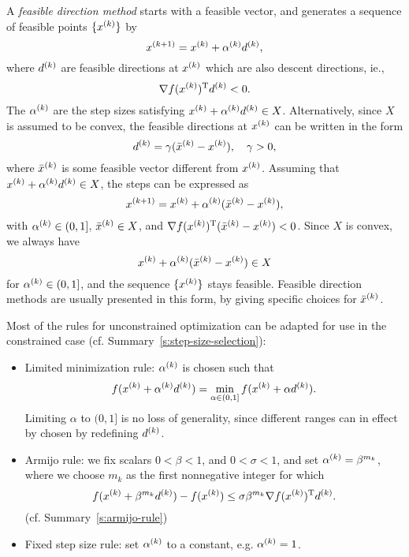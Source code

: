 \documentclass{article}
\begin{document}
A \emph{feasible direction method} starts with a feasible vector, and generates a sequence of
feasible points \(\{\kth{x}\}\) by
\begin{equation*}
  \kth[k+1]{x} = \kth{x} + \kth{\alpha}\kth{d},
\end{equation*}
where \(\kth{d}\) are feasible directions at \(\kth{x}\) which are also descent directions, ie.,
\begin{equation*}
  \T{\nabla f(\kth{x})}\kth{d} < 0.
\end{equation*}
The \(\kth{\alpha}\) are the step sizes satisfying \(\kth{x} + \kth{\alpha} \kth{d} \in X\).
Alternatively, since \(X\) is assumed to be convex, the feasible directions at \(\kth{x}\) can be
written in the form
\begin{equation*}
  \kth{d} = \gamma(\kth{\bar{x}} - \kth{x}), \quad \gamma > 0,
\end{equation*}
where \(\kth{\bar{x}}\) is some feasible vector different from \(\kth{x}\).  Assuming that
\(\kth{x} + \kth{\alpha} \kth{d} \in X\), the steps can be expressed as
\begin{equation*}
  \kth[k+1]{x} = \kth{x} + \kth{\alpha}(\kth{\bar{x}} - \kth{x}),
\end{equation*}
with \(\kth{\alpha} \in (0, 1]\), \(\kth{\bar{x}} \in X\), and
\(\T{\nabla f(\kth{x})}(\kth{\bar{x}} - \kth{x}) < 0\).  Since \(X\) is convex, we always have
\begin{equation*}
\kth{x} + \kth{\alpha}(\kth{\bar{x}} - \kth{x}) \in X  
\end{equation*}
for \(\kth{\alpha} \in (0, 1]\), and the sequence \(\{\kth{x}\}\) stays feasible.  Feasible
direction methods are usually presented in this form, by giving specific choices for
\(\kth{\bar{x}}\).

\label{s:step-size-selection-constrained}

Most of the rules for unconstrained optimization can be adapted for use in the constrained case
(cf. Summary~\ref{s:step-size-selection}):
\begin{itemize}
\item Limited minimization rule: \(\kth{\alpha}\) is chosen such that
  \begin{equation*}
    f(\kth{x} + \kth{\alpha}\kth{d}) = \min_{\alpha \in (0, 1]} f(\kth{x} + \alpha\kth{d}).
  \end{equation*}
  Limiting \(\alpha\) to \((0, 1]\) is no loss of generality, since different ranges can in effect
  by chosen by redefining \(\kth{d}\). 
\item Armijo rule: we fix scalars \(0 < \beta < 1\), and \(0 < \sigma < 1\), and set
  \(\kth{\alpha} = \beta^{m_k}\), where we choose \(m_k\) as the first nonnegative integer for which
  \begin{equation*}
    f(\kth{x} + \beta^{m_k} \kth{d}) - f(\kth{x}) \leq \sigma \beta^{m_k} \nabla \T{f(\kth{x})} \kth{d}.
  \end{equation*}
  (cf. Summary~\ref{s:armijo-rule})
\item Fixed step size rule: set \(\kth{\alpha}\) to a constant, e.g. \(\kth{\alpha} = 1\).
\end{itemize}
\end{document}
